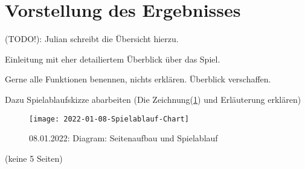 

\section{Vorstellung des Ergebnisses}

(TODO!): Julian schreibt die Übersicht hierzu.

Einleitung mit eher detailiertem Überblick über das Spiel.

Gerne alle Funktionen benennen, nichts erklären. Überblick verschaffen. 


Dazu Spielablaufskizze abarbeiten (Die Zeichnung(\ref{fig:2022-01-08-Spielablauf-Chart}) und Erläuterung erklären)

\begin{figure}[H]
    \centering
    \caption[]{08.01.2022: Diagram: Seitenaufbau und Spielablauf}
    \label{fig:2022-01-08-Spielablauf-Chart}
    \texttt{[image: 2022-01-08-Spielablauf-Chart]}
\end{figure}


(keine 5 Seiten)

